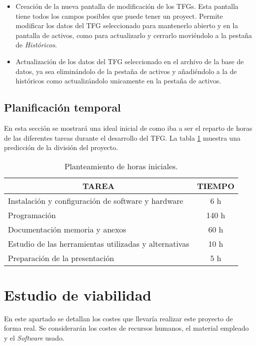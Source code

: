 \begin{itemize}
\begin{itemize}
		\item Creación de la nueva pantalla de modificación de los TFGs. Esta pantalla tiene todos los campos posibles que puede tener un proyect. Permite modificar los datos del TFG seleccionado para mantenerlo abierto y en la pantalla de activos, como para actualizarlo y cerrarlo moviéndolo a la pestaña de \emph{Históricos}.
		\item Actualización de los datos del TFG seleccionado en el archivo de la base de datos, ya sea eliminándolo de la pestaña de activos y añadiéndolo a la de históricos como actualizándolo unicamente en la pestaña de activos.
	\end{itemize}
\end{itemize}

\subsection{Planificación temporal}

En esta sección se mostrará una ideal inicial de como iba a ser el reparto de horas de las diferentes tareas durante el desarrollo del TFG. La tabla \ref{horas} muestra una predicción de la división del proyecto.


\begin{table}[]
	\label{horas}
	\centering
	\begin{tabular}{|l|c|}
		\hline
		\multicolumn{1}{|c|}{\textbf{TAREA}}     & \textbf{TIEMPO} \\ \hline
		Instalación y configuración de software y hardware & 6 h  \\ \hline
		Programación                            & 140 h         \\ \hline
		Documentación memoria y anexos          & 60 h          \\ \hline
		Estudio de las herramientas utilizadas y alternativas & 10 h \\ \hline
		Preparación de la presentación		    & 5 h           \\ \hline
	\end{tabular}
	\caption{Planteamiento de horas iniciales.}
\end{table}


\section{Estudio de viabilidad}
En este apartado se detallan los costes que llevaría realizar este proyecto de forma real. Se considerarán los costes de recursos humanos, el material empleado y el \emph{Software} usado. 

